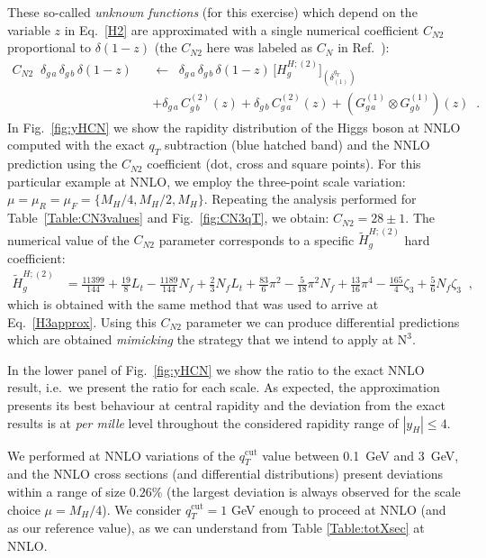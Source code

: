 \documentclass[12pt]{article}
\DeclareRobustCommand{\nn}{\nonumber}
\def\beeq{\begin{eqnarray}}
\def\eeeq{\end{eqnarray}}
\DeclareRobustCommand{\qt}{\ensuremath{q_T}\xspace}
\DeclareRobustCommand{\qtcut}{\ensuremath{q_T^\mathrm{cut}}\xspace}
\DeclareRobustCommand{\LO}{\text{LO}\xspace}
\DeclareRobustCommand{\N}[1]{\ensuremath{\text{N}^{#1}}} %
\begin{document}
These so-called \textit{unknown functions} (for this exercise) which depend on the variable $z$ in Eq.~\eqref{H2} are approximated with a single numerical coefficient $C_{N2}$ proportional to $\delta(1-z)$ (the $C_{N2}$ here was labeled as $C_{N}$ in Ref.~\cite{Bozzi:2005wk}):
\beeq
\label{CNeq}
C_{N2}\;\;\delta_{g\,a} \,\delta_{g\,b} \,\delta(1-z) && \!\!\!\!\!\! \leftarrow\;\; \delta_{g\,a} \,\delta_{g\,b} \,\delta(1-z)
\, \big[H^{H;(2)}_{g}\big]_{(\delta^{\qt}_{(1)})}\nn\\
&&+\delta_{g\,a} \,C^{(2)}_{g\,b}(z)+\delta_{g\,b} \,C^{(2)}_{g\,a}(z)+
\left(G^{(1)}_{g\,a}\otimes G^{(1)}_{g\,b}\right)(z)\;\; .
\eeeq 
In Fig.~\ref{fig:yHCN} we show the rapidity distribution of the Higgs boson at NNLO computed with the exact $\qt$ subtraction (blue hatched band) and the NNLO prediction using the $C_{N2}$ coefficient (dot, cross and square points). For this particular example at NNLO, we employ the three-point scale variation: $\mu=\mu_{R}=\mu_{F}=\{M_{H}/4,M_{H}/2,M_{H}\}$. Repeating the analysis performed for Table~\ref{Table:CN3values} and Fig.~\ref{fig:CN3qT}, we obtain: $C_{N2}=28\pm 1$. The numerical value of the $C_{N2}$ parameter corresponds to a specific $\widetilde{H}^{H;(2)}_{g}$ hard coefficient:
\begin{align}
\label{Ht2g}
\widetilde{H}^{H;(2)}_{g}&=\frac{11399}{144}+\frac{19}{8} L_{t}-\frac{1189}{144} N_{f}+\frac{2}{3} N_{f} L_{t}+\frac{83}{6} \pi^{2} -\frac{5}{18} \pi^{2} N_{f} + \frac{13}{16} \pi^{4} - \frac{165}{4} \zeta_{3} + \frac{5}{6} N_{f} \zeta_{3}\;\;,
\end{align}
which is obtained with the same method that was used to arrive at Eq.~\eqref{H3approx}.
Using this $C_{N2}$ parameter we can produce differential predictions which are obtained \textit{mimicking} the strategy that we intend to apply at \N3\LO. 

In the lower panel of Fig.~\ref{fig:yHCN} we show the ratio to the exact NNLO result, i.e.\ we present the ratio for each scale. As expected, the approximation presents its best behaviour at central rapidity and the deviation from the exact results is at \textit{per mille} level throughout the considered rapidity range of $|y_{H}|\leq 4$.

We performed at NNLO variations of the $\qtcut$ value between 0.1~GeV and 3~GeV, and the NNLO cross sections (and differential distributions) present deviations within a range of size $0.26\%$  (the largest deviation is always observed for the scale choice $\mu=M_{H}/4$).  We consider $\qtcut=1$ GeV enough to proceed at NNLO (and as our reference value), as we can understand from Table \ref{Table:totXsec} at NNLO.
\end{document}
